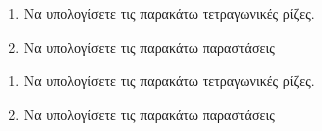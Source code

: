 \begin{enumerate}
\item Να υπολογίσετε τις παρακάτω τετραγωνικές ρίζες.
\begin{multicols}{2}
\end{multicols}
\item Να υπολογίσετε τις παρακάτω παραστάσεις
\begin{multicols}{2}
\end{multicols}
\end{enumerate}
\begin{enumerate}
\item Να υπολογίσετε τις παρακάτω τετραγωνικές ρίζες.
\begin{multicols}{2}
\end{multicols}
\item Να υπολογίσετε τις παρακάτω παραστάσεις
\begin{multicols}{2}
\end{multicols}
\end{enumerate}
